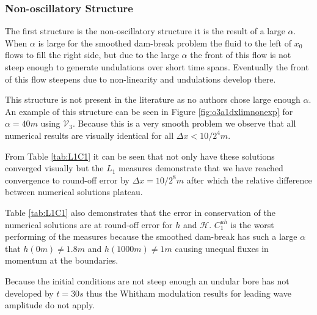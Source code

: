 \documentclass[times]{elsarticle}
\begin{document}
\subsubsection{Non-oscillatory Structure}
The first structure is the non-oscillatory structure it is the result of a large $\alpha$. When $\alpha$ is large for the smoothed dam-break problem the fluid to the left of $x_0$ flows to fill the right side, but due to the large $\alpha$ the front of this flow is not steep enough to generate undulations over short time spans. Eventually the front of this flow steepens due to non-linearity and undulations develop there.

This structure is not present in the literature as no authors chose large enough $\alpha$. An example of this structure can be seen in Figure \ref{fig:o3a1dxlimnonexp} for $\alpha = 40m$ using $\mathcal{V}_3$. Because this is a very smooth problem we observe that all numerical results are visually identical for all $\Delta x < 10 / 2^4m$.

From Table \ref{tab:L1C1} it can be seen that not only have these solutions converged visually but the $L_1$ measures demonstrate that we have reached convergence to round-off error by $\Delta x = 10 / 2^8m$ after which the relative difference between numerical solutions plateau. 

Table \ref{tab:L1C1} also demonstrates that the error in conservation of the numerical solutions are at round-off error for $h$ and $\mathcal{H}$. $C^{uh}_1$ is the worst performing of the measures because the smoothed dam-break has such a large $\alpha$ that $h(0m) \neq 1.8m$ and $h(1000m) \neq 1m$ causing unequal fluxes in momentum at the boundaries.  

Because the initial conditions are not steep enough an undular bore has not developed by $t=30s$ thus the Whitham modulation results for leading wave amplitude do not apply.
\end{document}

